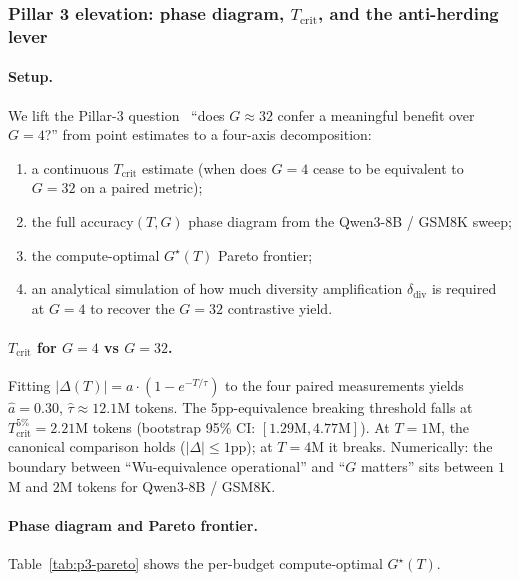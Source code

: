 
\subsubsection{Pillar 3 elevation: phase diagram, $T_\text{crit}$, and the anti-herding lever}
\label{sec:pillar3-iter23}

\paragraph{Setup.}
We lift the Pillar-3 question~\cite{tan2025scalingrl} ``does $G\!\approx\!32$ confer a meaningful
benefit over $G\!=\!4$?'' from point estimates to a four-axis decomposition:
\begin{enumerate}\itemsep1pt
\item a continuous $T_\text{crit}$ estimate (when does $G\!=\!4$ cease to be
      equivalent to $G\!=\!32$ on a paired metric);
\item the full accuracy$(T, G)$ phase diagram from the Qwen3-8B / GSM8K sweep;
\item the compute-optimal $G^\star(T)$ Pareto frontier;
\item an analytical simulation of how much diversity amplification
      $\delta_\text{div}$ is required at $G\!=\!4$ to recover the
      $G\!=\!32$ contrastive yield.
\end{enumerate}

\paragraph{$T_\text{crit}$ for $G=4$ vs $G=32$.}
Fitting $|\Delta(T)| = a \cdot (1 - e^{-T/\tau})$ to the four paired measurements
yields $\hat a=0.30$, $\hat\tau \!\approx\! 12.1$M tokens.
The 5pp-equivalence breaking threshold falls at
$T_\text{crit}^{5\%}\!=\!2.21$M tokens
(bootstrap 95\% CI: $[1.29\text{M}, 4.77\text{M}]$).  At $T\!=\!1$M, the
canonical comparison holds ($|\Delta|\!\le\!1$pp); at $T\!=\!4$M it breaks.
Numerically: the boundary between ``Wu-equivalence operational'' and
``$G$ matters'' sits between $1$M and $2$M tokens for Qwen3-8B / GSM8K.

\paragraph{Phase diagram and Pareto frontier.}
Table~\ref{tab:p3-pareto} shows the per-budget compute-optimal $G^\star(T)$.

